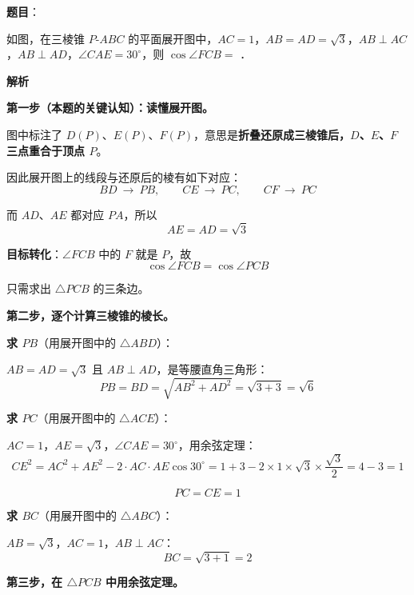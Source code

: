 \begin{answer}

\textbf{题目}：

如图，在三棱锥 $P\text{-}ABC$ 的平面展开图中，$AC=1$，$AB=AD=\sqrt3$，$AB\perp AC$，$AB\perp AD$，$\angle CAE=30^\circ$，则 $\cos\angle FCB=$ \gkblank{}．
\nopagebreak[4]
\begin{center}\end{center}
\nopagebreak[4]
\textbf{解析}

\textbf{第一步（本题的关键认知）：读懂展开图。}

图中标注了 $D(P)$、$E(P)$、$F(P)$，意思是\textbf{折叠还原成三棱锥后，$D$、$E$、$F$ 三点重合于顶点 $P$}。

因此展开图上的线段与还原后的棱有如下对应：
\nopagebreak[4]
\[BD\ \longrightarrow\ PB,\qquad CE\ \longrightarrow\ PC,\qquad CF\ \longrightarrow\ PC\]

而 $AD$、$AE$ 都对应 $PA$，所以
\nopagebreak[4]
\[AE=AD=\sqrt3\]

\textbf{目标转化}：$\angle FCB$ 中的 $F$ 就是 $P$，故
\nopagebreak[4]
\[\cos\angle FCB=\cos\angle PCB\]

只需求出 $\triangle PCB$ 的三条边。

\par\medskip

\textbf{第二步，逐个计算三棱锥的棱长。}

\textbf{求 $PB$}（用展开图中的 $\triangle ABD$）：

$AB=AD=\sqrt3$ 且 $AB\perp AD$，是等腰直角三角形：
\nopagebreak[4]
\[PB=BD=\sqrt{AB^{2}+AD^{2}}=\sqrt{3+3}=\sqrt6\]

\textbf{求 $PC$}（用展开图中的 $\triangle ACE$）：

$AC=1$，$AE=\sqrt3$，$\angle CAE=30^\circ$，用余弦定理：
\nopagebreak[4]
\[CE^{2}=AC^{2}+AE^{2}-2\cdot AC\cdot AE\cos30^\circ=1+3-2\times1\times\sqrt3\times\frac{\sqrt3}2=4-3=1\]

\nopagebreak[4]
\[PC=CE=1\]

\textbf{求 $BC$}（用展开图中的 $\triangle ABC$）：

$AB=\sqrt3$，$AC=1$，$AB\perp AC$：
\nopagebreak[4]
\[BC=\sqrt{3+1}=2\]

\par\medskip

\textbf{第三步，在 $\triangle PCB$ 中用余弦定理。}


\end{answer}

